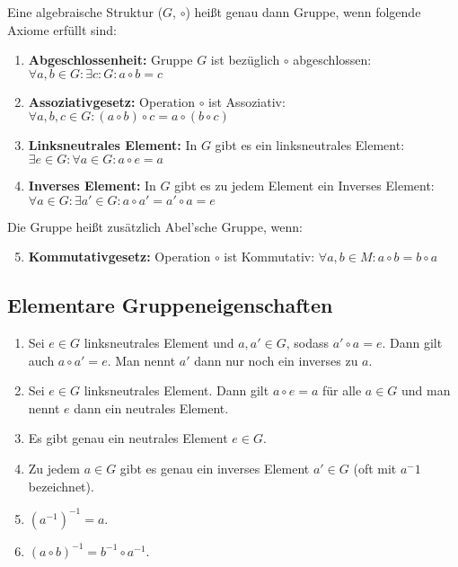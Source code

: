 Eine algebraische Struktur ($G$, $\circ$) heißt genau dann Gruppe, wenn folgende Axiome erfüllt sind:
\begin{enumerate}
    \item \textbf{Abgeschlossenheit:} Gruppe $G$ ist bezüglich $\circ$ abgeschlossen: $\forall a,b\in G : \exists c: G: a\circ b=c$
    \item \textbf{Assoziativgesetz:} Operation $\circ$ ist Assoziativ: $\forall a,b,c\in G: (a\circ b)\circ c=a\circ (b\circ c)$
    \item \textbf{Linksneutrales Element:} In $G$ gibt es ein linksneutrales Element: $\exists e\in G: \forall a\in G: a\circ e = a$
    \item \textbf{Inverses Element:} In $G$ gibt es zu jedem Element ein Inverses Element: $\forall a\in G:\exists a'\in G: a\circ a'=a'\circ a=e$
\end{enumerate}
Die Gruppe heißt zusätzlich Abel'sche Gruppe, wenn:
\begin{enumerate}
    \setcounter{enumi}{4}
    \item \textbf{Kommutativgesetz:} Operation $\circ$ ist Kommutativ: $\forall a,b\in M: a\circ b=b\circ a$
\end{enumerate}
\subsection{Elementare Gruppeneigenschaften}\label{subsec:elementare-gruppeneigenschaften}
\begin{enumerate}
    \item Sei $e\in G$ linksneutrales Element und $a,a'\in G$, sodass $a'\circ a=e$.
    Dann gilt auch $a\circ a'=e$.
    Man nennt $a'$ dann nur noch ein inverses zu $a$.
    \item Sei $e\in G$ linksneutrales Element.
    Dann gilt $a\circ e=a$ für alle $a\in G$ und man nennt $e$ dann ein neutrales Element.
    \item Es gibt genau ein neutrales Element $e\in G$.
    \item Zu jedem $a\in G$ gibt es genau ein inverses Element $a'\in G$ (oft mit $a^-1$ bezeichnet).
    \item $(a^{-1})^{-1}=a$.
    \item $(a\circ b)^{-1}=b^{-1}\circ a^{-1}$.
\end{enumerate}

